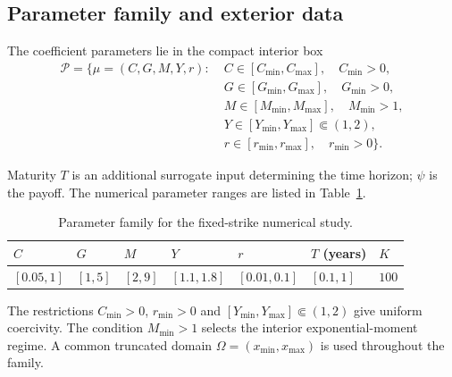 \documentclass[11pt]{amsart}
\theoremstyle{remark}
\newcommand{\Pset}{\mathcal{P}}
\newcommand{\rf}{r}
\begin{document}
\subsection{Parameter family and exterior data}
\label{ssec:family}\label{ssec:finite-domain}
The coefficient parameters lie in the compact interior box
\begin{equation}
\begin{aligned}
 \Pset=\bigl\{\mu=(C,G,M,Y,\rf):\;&
 C\in[C_{\min},C_{\max}],\quad C_{\min}>0,\\
 &G\in[G_{\min},G_{\max}],\quad G_{\min}>0,\\
 &M\in[M_{\min},M_{\max}],\quad M_{\min}>1,\\
 &Y\in[Y_{\min},Y_{\max}]\Subset(1,2),\\
 &\rf\in[r_{\min},r_{\max}],\quad r_{\min}>0\bigr\}.
\end{aligned}
 \label{eq:parameter-set}
\end{equation}

Maturity $T$ is an additional surrogate input determining the time horizon;
$\psi$ is the payoff. The numerical parameter ranges are listed in
Table~\ref{tab:proposed-box}.
\begin{table}[ht]
\centering\small
\caption{Parameter family for the fixed-strike numerical study.}
\label{tab:proposed-box}
\begin{tabular}{lllllll}
\toprule
$C$ & $G$ & $M$ & $Y$ & $r$ & $T$ (years) & $K$\\
\midrule
$[0.05,1]$ & $[1,5]$ & $[2,9]$ & $[1.1,1.8]$ & $[0.01,0.1]$ & $[0.1,1]$ & $100$\\
\bottomrule
\end{tabular}
\end{table}
The restrictions $C_{\min}>0$, $r_{\min}>0$ and
$[Y_{\min},Y_{\max}]\Subset(1,2)$ give uniform coercivity.
The condition $M_{\min}>1$ selects the interior exponential-moment regime.
A common truncated domain $\Omega=(x_{\min},x_{\max})$ is used throughout
the family.
\end{document}

